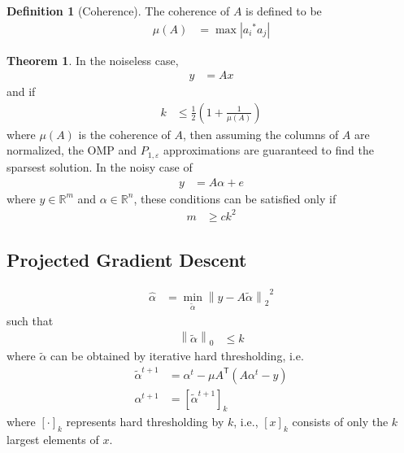 \documentclass[titlepage, fleqn, a4paper, 12pt, twoside]{article}
\theoremstyle{definition}
\newtheorem{definition}{Definition}
\theoremstyle{theorem}
\newtheorem{theorem}{Theorem}
\renewcommand{\tilde}{\widetilde}
\def\transpose#1{{#1}^{\mathsf{T}}}
\begin{document}
\begin{definition}[Coherence]
	The coherence of $A$ is defined to be
	\begin{align*}
		\mu(A) &= \max\left| {a_i}^* a_j \right|
	\end{align*}
\end{definition}

\begin{theorem}
	In the noiseless case,
	\begin{align*}
		y &= A x
	\end{align*}
	and if
	\begin{align*}
		k &\le \frac{1}{2} \left( 1 + \frac{1}{\mu(A)} \right)
	\end{align*}
	where $\mu(A)$ is the coherence of $A$, then assuming the columns of $A$ are normalized, the OMP and $P_{1,\varepsilon}$ approximations are guaranteed to find the sparsest solution.
	In the noisy case of
	\begin{align*}
		y &= A \alpha + e
	\end{align*}
	where $y \in \mathbb{R}^m$ and $\alpha \in \mathbb{R}^n$, these conditions can be satisfied only if
	\begin{align*}
		m &\ge c k^2
	\end{align*}
\end{theorem}

\subsection{Projected Gradient Descent}

\begin{align*}
	\hat{\alpha} &= \min\limits_{\tilde{\alpha}} {\left\| y - A \tilde{\alpha} \right\|_2}^2
\end{align*}
such that
\begin{align*}
	\left\| \tilde{\alpha} \right\|_0 &\le k
\end{align*}
where $\tilde{\alpha}$ can be obtained by iterative hard thresholding, i.e.
\begin{align*}
	{\tilde{\alpha}}^{t + 1} &= \alpha^t - \mu \transpose{A} \left( A \alpha^t - y \right)\\
	\alpha^{t + 1} &= [{\tilde{\alpha}}^{t + 1}]_k
\end{align*}
where $[ \cdot ]_k$ represents hard thresholding by $k$, i.e., $[x]_k$ consists of only the $k$ largest elements of $x$.
\end{document}
